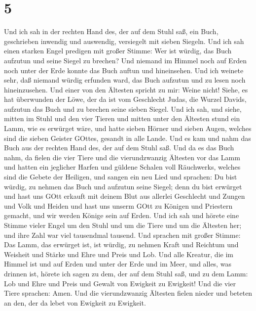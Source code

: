\hypertarget{section-3}{%
\section{5}\label{section-3}}

 Und ich sah in der rechten Hand des, der auf dem Stuhl saß,
ein Buch, geschrieben inwendig und auswendig, versiegelt mit sieben
Siegeln.  Und ich sah einen starken Engel predigen mit
großer Stimme: Wer ist würdig, das Buch aufzutun und seine Siegel zu
brechen?  Und niemand im Himmel noch auf Erden noch unter
der Erde konnte das Buch auftun und hineinsehen.  Und ich
weinete sehr, daß niemand würdig erfunden ward, das Buch aufzutun und zu
lesen noch hineinzusehen.  Und einer von den Ältesten
spricht zu mir: Weine nicht! Siehe, es hat überwunden der Löwe, der da
ist vom Geschlecht Judas, die Wurzel Davids, aufzutun das Buch und zu
brechen seine sieben Siegel.  Und ich sah, und siehe, mitten
im Stuhl und den vier Tieren und mitten unter den Ältesten stund ein
Lamm, wie es erwürget wäre, und hatte sieben Hörner und sieben Augen,
welches sind die sieben Geister GOttes, gesandt in alle Lande.
 Und es kam und nahm das Buch aus der rechten Hand des, der
auf dem Stuhl saß.  Und da es das Buch nahm, da fielen die
vier Tiere und die vierundzwanzig Ältesten vor das Lamm und hatten ein
jeglicher Harfen und güldene Schalen voll Räuchwerks, welches sind die
Gebete der Heiligen,  und sangen ein neu Lied und sprachen:
Du bist würdig, zu nehmen das Buch und aufzutun seine Siegel; denn du
bist erwürget und hast uns GOtt erkauft mit deinem Blut aus allerlei
Geschlecht und Zungen und Volk und Heiden  und hast uns
unserm GOtt zu Königen und Priestern gemacht, und wir werden Könige sein
auf Erden.  Und ich sah und hörete eine Stimme vieler Engel
um den Stuhl und um die Tiere und um die Ältesten her; und ihre Zahl war
viel tausendmal tausend.  Und sprachen mit großer Stimme:
Das Lamm, das erwürget ist, ist würdig, zu nehmen Kraft und Reichtum und
Weisheit und Stärke und Ehre und Preis und Lob.  Und alle
Kreatur, die im Himmel ist und auf Erden und unter der Erde und im Meer,
und alles, was drinnen ist, hörete ich sagen zu dem, der auf dem Stuhl
saß, und zu dem Lamm: Lob und Ehre und Preis und Gewalt von Ewigkeit zu
Ewigkeit!  Und die vier Tiere sprachen: Amen. Und die
vierundzwanzig Ältesten fielen nieder und beteten an den, der da lebet
von Ewigkeit zu Ewigkeit.

